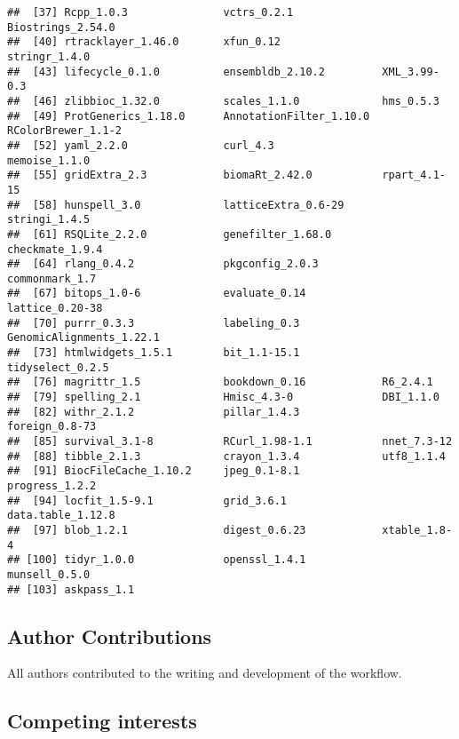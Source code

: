 \documentclass[
]{article}
\begin{document}
\begin{verbatim}
##  [37] Rcpp_1.0.3               vctrs_0.2.1              Biostrings_2.54.0       
##  [40] rtracklayer_1.46.0       xfun_0.12                stringr_1.4.0           
##  [43] lifecycle_0.1.0          ensembldb_2.10.2         XML_3.99-0.3            
##  [46] zlibbioc_1.32.0          scales_1.1.0             hms_0.5.3               
##  [49] ProtGenerics_1.18.0      AnnotationFilter_1.10.0  RColorBrewer_1.1-2      
##  [52] yaml_2.2.0               curl_4.3                 memoise_1.1.0           
##  [55] gridExtra_2.3            biomaRt_2.42.0           rpart_4.1-15            
##  [58] hunspell_3.0             latticeExtra_0.6-29      stringi_1.4.5           
##  [61] RSQLite_2.2.0            genefilter_1.68.0        checkmate_1.9.4         
##  [64] rlang_0.4.2              pkgconfig_2.0.3          commonmark_1.7          
##  [67] bitops_1.0-6             evaluate_0.14            lattice_0.20-38         
##  [70] purrr_0.3.3              labeling_0.3             GenomicAlignments_1.22.1
##  [73] htmlwidgets_1.5.1        bit_1.1-15.1             tidyselect_0.2.5        
##  [76] magrittr_1.5             bookdown_0.16            R6_2.4.1                
##  [79] spelling_2.1             Hmisc_4.3-0              DBI_1.1.0               
##  [82] withr_2.1.2              pillar_1.4.3             foreign_0.8-73          
##  [85] survival_3.1-8           RCurl_1.98-1.1           nnet_7.3-12             
##  [88] tibble_2.1.3             crayon_1.3.4             utf8_1.1.4              
##  [91] BiocFileCache_1.10.2     jpeg_0.1-8.1             progress_1.2.2          
##  [94] locfit_1.5-9.1           grid_3.6.1               data.table_1.12.8       
##  [97] blob_1.2.1               digest_0.6.23            xtable_1.8-4            
## [100] tidyr_1.0.0              openssl_1.4.1            munsell_0.5.0           
## [103] askpass_1.1
\end{verbatim}

\hypertarget{author-contributions}{%
\subsection{Author Contributions}\label{author-contributions}}

All authors contributed to the writing and development of the workflow.

\hypertarget{competing-interests}{%
\subsection{Competing interests}\label{competing-interests}}
\end{document}

